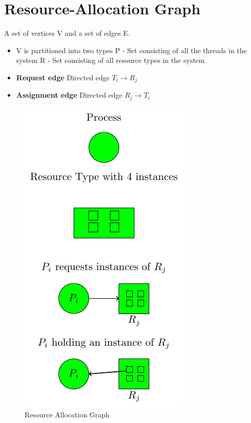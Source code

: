 \documentclass{book/custombook}
\begin{document}
        \section{Resource-Allocation Graph}
            A set of vertices V and a set of edges E.
            \begin{itemize}
                \item V is partitioned into two types
                    \subitem P - Set consisting of all the threads in the system
                    \subitem R - Set consisting of all resource types in the system
                \item \textbf{Request edge}
                    \subitem Directed edge $T_i \rightarrow R_j$
                \item \textbf{Assignment edge}
                    \subitem Directed edge $R_j \rightarrow T_i$
            \end{itemize}
            \begin{figure}[H]
                \centering
                \includegraphics{figures/resource_allocation_graph.pdf}
                \caption{Resource Allocation Graph}
            \end{figure}
\end{document}
